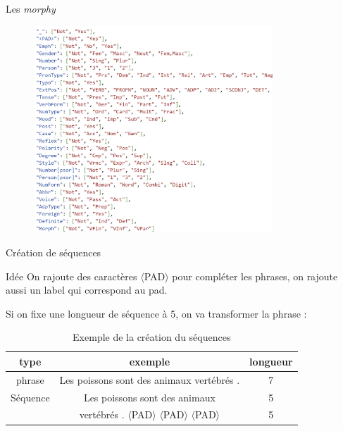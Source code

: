 \documentclass[11pt]{beamer}
\begin{document}
\begin{frame}{Les \textit{morphy}}
    \begin{figure}
        \centering
        \includegraphics[width=0.8\textwidth]{all_morphy.png}
    \end{figure}
\end{frame}

\begin{frame}{Création de séquences}
    \begin{exampleblock}{Idée}
        On rajoute des caractères $\langle$PAD$\rangle$ pour compléter les phrases,
        on rajoute aussi un label qui correspond au pad.
    \end{exampleblock}

    \bigskip
    Si on fixe une longueur de séquence à 5, on va transformer la phrase :
    \begin{table}
        \centering
        \begin{tabular}{|c|c|c|}
            \hline
            \textbf{type} & \textbf{exemple} & \textbf{longueur} \\
            \hline
            phrase & Les poissons sont des animaux vertébrés . & 7 \\
            \hline
            Séquence & Les poissons sont des animaux & 5\\
             & vertébrés . $\langle$PAD$\rangle$ $\langle$PAD$\rangle$ $\langle$PAD$\rangle$ & 5\\
            \hline
        \end{tabular}
        \caption{Exemple de la création du séquences}
    \end{table}
\end{frame}
\end{document}
